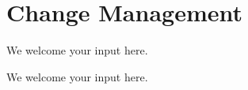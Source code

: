 \section{Change Management}\label{sec:ekgmm-a-2-3}

We welcome your input here.

\ekgmmContextSection

We welcome your input here.
